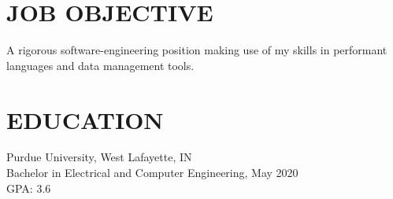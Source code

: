\documentclass[10pt]{res}
\begin{document}
 
\vspace{-30pt}

\address{\bf  PRESENT ADDRESS\\ 1165 West Stadium Avenue \\ West Lafayette IN 47906-4235 }
\address{\bf PERMANENT ADDRESS \\ 14977 Montclair Drive \\ Westfield, IN, 46074 \\ (317) 363-7700 \\ joseph@gerardot.org/indyjag@gmail.com } 
                                  
\begin{resume}

\vspace{-10pt}\section{JOB OBJECTIVE}          
	A rigorous software-engineering position making use of my skills in performant languages
  and data management tools. 
\vspace{-10pt}\section{EDUCATION}          
    Purdue University, West Lafayette, IN \\ 
    Bachelor in Electrical and Computer Engineering, May 2020   \\       
	GPA: 3.6 \\
 

\end{resume}
\end{document}
